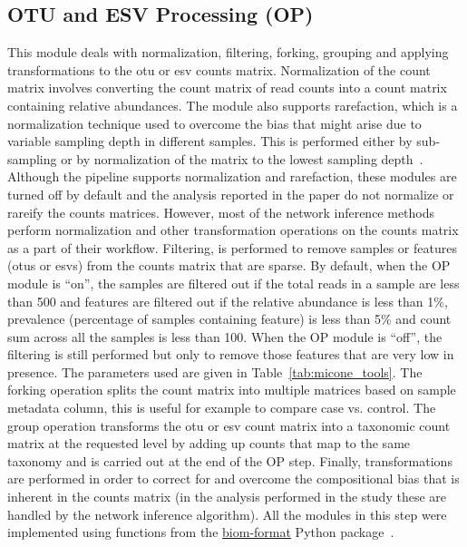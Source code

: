   \subsection*{OTU and ESV Processing (OP)}
  \vspace{-5mm}
  This module deals with normalization, filtering, forking, grouping and applying transformations to the \ac{otu} or \ac{esv} counts matrix.
  Normalization of the count matrix involves converting the count matrix of read counts into a count matrix containing relative abundances.
  The module also supports rarefaction, which is a normalization technique used to overcome the bias that might arise due to variable sampling depth in different samples.
  This is performed either by sub-sampling or by normalization of the matrix to the lowest sampling depth~\cite{Weiss2015}.
  Although the pipeline supports normalization and rarefaction, these modules are turned off by default and the analysis reported in the paper do not normalize or rareify the counts matrices.
  However, most of the network inference methods perform normalization and other transformation operations on the counts matrix as a part of their workflow.
  Filtering, is performed to remove samples or features (\ac{otu}s or \ac{esv}s) from the counts matrix that are sparse.
  By default, when the OP module is ``on'', the samples are filtered out if the total reads in a sample are less than 500 and features are filtered out if the relative abundance is less than 1\%, prevalence (percentage of samples containing feature) is less than 5\% and count sum across all the samples is less than 100.
  When the OP module is ``off'', the filtering is still performed but only to remove those features that are very low in presence.
  The parameters used are given in Table~\ref{tab:micone_tools}.
  The forking operation splits the count matrix into multiple matrices based on sample metadata column, this is useful for example to compare case vs. control.
  The group operation transforms the \ac{otu} or \ac{esv} count matrix into a taxonomic count matrix at the requested level by adding up counts that map to the same taxonomy and is carried out at the end of the OP step.
  Finally, transformations are performed in order to correct for and overcome the compositional bias that is inherent in the counts matrix (in the analysis performed in the study these are handled by the network inference algorithm).
  All the modules in this step were implemented using functions from the \href{http://biom-format.org/}{biom-format} Python package~\cite{mcdonaldBiologicalObservationMatrix2012}.

